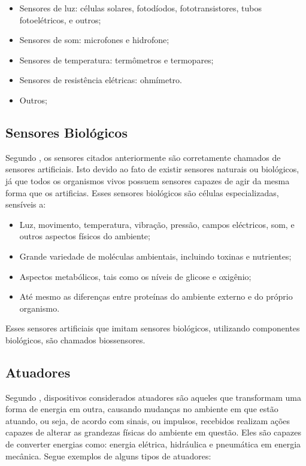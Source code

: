 \begin{itemize}
\item Sensores de luz: células solares, fotodíodos, fototransistores, tubos fotoelétricos, e outros;
\item Sensores de som: microfones e hidrofone;
\item Sensores de temperatura: termômetros e termopares;
\item Sensores de resistência elétricas: ohmímetro. 
\item Outros;
\end{itemize}

\subsection{Sensores Biológicos}
Segundo \cite{nomadusp2014}, os sensores citados anteriormente são corretamente chamados de sensores artificiais. Isto devido ao fato de existir sensores naturais ou biológicos, já que todos os organismos vivos possuem sensores capazes de agir da mesma forma que os artificias. Esses sensores biológicos são células especializadas, sensíveis a:

\begin{itemize}
\item Luz, movimento, temperatura, vibração, pressão, campos eléctricos, som, e outros aspectos físicos do ambiente;
\item Grande variedade de moléculas ambientais, incluindo toxinas e nutrientes;
\item Aspectos metabólicos, tais como os níveis de glicose e oxigênio;
\item Até mesmo as diferenças entre proteínas do ambiente externo e do próprio organismo.
\end{itemize}

Esses sensores artificiais que imitam sensores biológicos, utilizando componentes biológicos, são chamados biossensores.

\subsection{Atuadores}
Segundo \cite{chironis1991mechanisms}, dispositivos considerados atuadores são aqueles que transformam uma forma de energia em outra, causando mudanças no ambiente em que estão atuando, ou seja, de acordo com sinais, ou impulsos, recebidos realizam ações capazes de alterar as grandezas físicas do ambiente em questão. Eles são capazes de converter energias como: energia elétrica, hidráulica e pneumática em energia mecânica. Segue exemplos de alguns tipos de atuadores:

